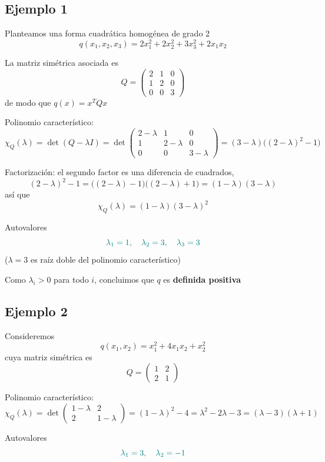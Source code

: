 \documentclass{article}
\begin{document}
\subsection*{Ejemplo 1}


Planteamos una forma cuadrática homogénea de grado 2
\[
q(x_1,x_2,x_3)=2x_1^2+2x_2^2+3x_3^2+2x_1x_2
\]

La matriz simétrica asociada es
\[
Q=\begin{pmatrix}
2 & 1 & 0\\
1 & 2 & 0\\
0 & 0 & 3
\end{pmatrix}
\]
de modo que \(q(x)=x^T Q x\)

Polinomio característico:
\[
\chi_Q(\lambda)=\det(Q-\lambda I)
=\det\!\begin{pmatrix}
2-\lambda & 1 & 0\\
1 & 2-\lambda & 0\\
0 & 0 & 3-\lambda
\end{pmatrix}
=(3-\lambda)\big((2-\lambda)^2-1\big)
\]

Factorización: el segundo factor es una diferencia de cuadrados,
\[
(2-\lambda)^2-1=\bigl((2-\lambda)-1\bigr)\bigl((2-\lambda)+1\bigr)=(1-\lambda)(3-\lambda)
\]
así que
\[
\chi_Q(\lambda)=(1-\lambda)(3-\lambda)^2
\]

Autovalores
\[ \color{teal}
\lambda_1=1,\quad \lambda_2=3,\quad \lambda_3=3
\]
(\(\lambda=3\) es raíz doble del polinomio característico)

{\color{teal}
Como \(\lambda_i>0\) para todo \(i\), concluimos que \(q\) es \textbf{definida positiva}}


\subsection*{Ejemplo 2}

Consideremos
\[
q(x_1,x_2)=x_1^2+4x_1x_2+x_2^2
\]
cuya matriz simétrica es
\[
Q=
\begin{pmatrix}
1 & 2\\
2 & 1
\end{pmatrix}
\]

Polinomio característico:
\[
\chi_Q(\lambda)=\det\begin{pmatrix}
1-\lambda & 2\\
2 & 1-\lambda
\end{pmatrix}
=(1-\lambda)^2-4=\lambda^2-2\lambda-3=(\lambda-3)(\lambda+1)
\]

Autovalores
\[\color{teal}
\lambda_1=3,\quad \lambda_2=-1
\]
\end{document}
